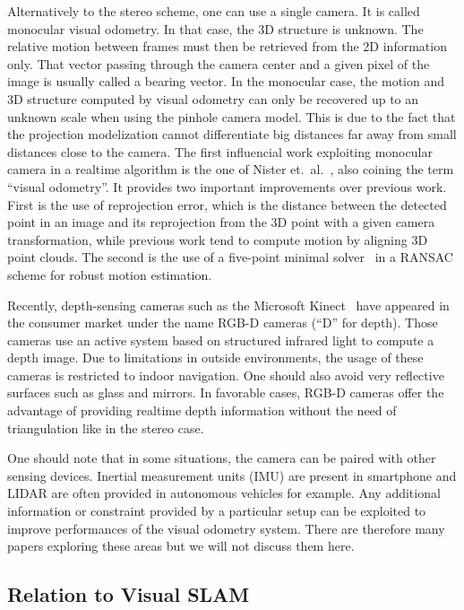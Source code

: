Alternatively to the stereo scheme, one can use a single camera.
It is called monocular visual odometry.
In that case, the 3D structure is unknown.
The relative motion between frames must then be retrieved
from the 2D information only.
That vector passing through the camera center and a given pixel of the image
is usually called a bearing vector.
In the monocular case, the motion and 3D structure computed by
visual odometry can only be recovered up to an unknown scale
when using the pinhole camera model.
This is due to the fact that the projection modelization cannot
differentiate big distances far away from small distances close to the camera.
The first influencial work exploiting monocular camera in a realtime algorithm
is the one of Nister et.\ al.~\cite{nister2004visual},
also coining the term ``visual odometry''.
It provides two important improvements over previous work.
First is the use of reprojection error,
which is the distance between the detected point in an image
and its reprojection from the 3D point with a given camera transformation,
while previous work tend to compute motion by aligning 3D point clouds.
The second is the use of a five-point minimal solver~\cite{nister2003efficient}
in a RANSAC scheme for robust motion estimation.

Recently, depth-sensing cameras such as the Microsoft Kinect~\cite{zhang2012microsoft}
have appeared in the consumer market under the name RGB-D cameras (``D'' for depth).
Those cameras use an active system based on structured infrared light
to compute a depth image.
Due to limitations in outside environments,
the usage of these cameras is restricted
to indoor navigation.
One should also avoid very reflective surfaces such as glass and mirrors.
In favorable cases, RGB-D cameras offer the advantage of providing
realtime depth information without the need of triangulation like in the stereo case.

One should note that in some situations, the camera can be paired
with other sensing devices.
Inertial measurement units (IMU) are present in smartphone
and LIDAR are often provided in autonomous vehicles for example.
Any additional information or constraint provided by a particular setup
can be exploited to improve performances of the visual odometry system.
There are therefore many papers exploring these areas but we will not discuss them here.

\subsection{Relation to Visual SLAM}%
\label{sub:relation-visual-slam}

